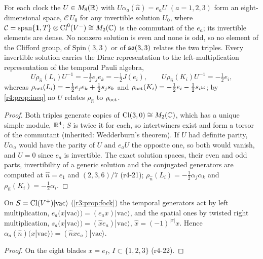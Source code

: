 \begin{theorem}
\label{r4:thm:conj}
For each clock the $U\in M_8(\mathbb{R})$ with $U\alpha_a(\hat n)=e_aU$ $(a=1,2,3)$ form an eight-dimensional space, $\mathcal C\,U_0$ for any invertible
solution $U_0$, where $\mathcal C=\operatorname{span}\{\mathbf 1,T\}\otimes\mathrm{Cl}^0(V^-)\cong M_2(\mathbb{C})$ is the commutant of the $e_a$; its invertible elements are dense. No nonzero solution is even and none is odd, so no element of the Clifford group, of
$\mathrm{Spin}(3,3)$ or of $\mathfrak{so}(3,3)$ relates the two triples. Every invertible solution carries the Dirac representation to the left-multiplication
representation of the temporal Pauli algebra,
\[
U\rho_{\hat n}(L_i)U^{-1}=-\tfrac12e_je_k=-\tfrac12J(e_i),\qquad U\rho_{\hat n}(K_i)U^{-1}=-\tfrac12e_i ,
\]
whereas $\rho_{\rm oct}(L_i)=-\tfrac12e_je_k+\tfrac12s_js_k$ and $\rho_{\rm oct}(K_i)=-\tfrac12e_i-\tfrac12s_i\omega$; by \cref{r4:prop:ineq} no $U$ relates $\rho_{\hat n}$ to $\rho_{\rm oct}$.
\end{theorem}

\begin{proof}
Both triples generate copies of $\mathrm{Cl}(3,0)\cong M_2(\mathbb{C})$, which has a unique simple module, $\mathbb{R}^4$; $S$ is twice it for each, so intertwiners exist and form
a torsor of the commutant (inherited: Wedderburn's theorem). If $U$ had definite parity, $U\alpha_a$ would have the parity of $U$ and $e_aU$ the
opposite one, so both would vanish, and $U=0$ since $e_a$ is invertible. The exact solution
spaces, their even and odd parts, invertibility of a generic solution and the conjugated generators are computed at $\hat n=e_1$ and $(2,3,6)/7$ (r4-21);
$\rho_{\hat n}(L_i)=-\tfrac12\alpha_j\alpha_k$ and $\rho_{\hat n}(K_i)=-\tfrac12\alpha_i$.
\end{proof}

\begin{proposition}
\label{r4:prop:fockLR}
On $S=\mathrm{Cl}(V^+)|\mathrm{vac}\rangle$ (\cref{r3:prop:fock}) the temporal generators act by left multiplication, $e_a(x|\mathrm{vac}\rangle)=(e_ax)|\mathrm{vac}\rangle$, and the spatial ones by twisted
right multiplication, $s_a(x|\mathrm{vac}\rangle)=(\hat x e_a)|\mathrm{vac}\rangle$, $\hat x=(-1)^{|x|}x$. Hence $\alpha_a(\hat n)(x|\mathrm{vac}\rangle)=(\hat n\hat xe_a)|\mathrm{vac}\rangle$.
\end{proposition}

\begin{proof}
On the eight blades $x=e_I$, $I\subset\{1,2,3\}$ (r4-22).
\end{proof}

